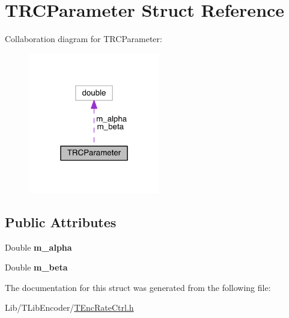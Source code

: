 \hypertarget{struct_t_r_c_parameter}{}\section{T\+R\+C\+Parameter Struct Reference}
\label{struct_t_r_c_parameter}


Collaboration diagram for T\+R\+C\+Parameter\+:
\nopagebreak
\begin{figure}[H]
\begin{center}
\leavevmode
\includegraphics[width=163pt]{d5/d44/struct_t_r_c_parameter__coll__graph}
\end{center}
\end{figure}
\subsection*{Public Attributes}
\begin{DoxyCompactItemize}
\item 
\mbox{\label{struct_t_r_c_parameter_a4cdd2245257c73fd9a940f5d415521c7}} 
Double {\bfseries m\+\_\+alpha}
\item 
\mbox{\label{struct_t_r_c_parameter_a7b0881db9acff72fc99d79992b0cb11c}} 
Double {\bfseries m\+\_\+beta}
\end{DoxyCompactItemize}


The documentation for this struct was generated from the following file\+:\begin{DoxyCompactItemize}
\item 
Lib/\+T\+Lib\+Encoder/\hyperlink{_t_enc_rate_ctrl_8h}{T\+Enc\+Rate\+Ctrl.\+h}\end{DoxyCompactItemize}
